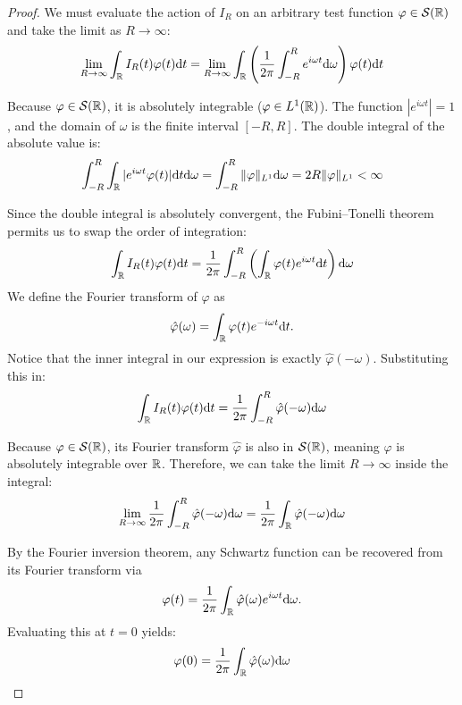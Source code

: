 \begin{proof}
We must evaluate the action of $I_R$ on an arbitrary test function $\varphi \in \mathcal{S}(\mathbb{R})$ and take the limit as $R \to \infty$:
\begin{equation}
\lim_{R \to \infty} \int_{\mathbb{R}} I_R(t) \varphi(t) \mathrm{d} t = \lim_{R \to \infty} \int_{\mathbb{R}} \left( \frac{1}{2\pi} \int_{-R}^R e^{i\omega t} \mathrm{d} \omega \right) \varphi(t) \mathrm{d} t
\end{equation}

Because $\varphi \in \mathcal{S}(\mathbb{R})$, it is absolutely integrable ($\varphi \in L^1(\mathbb{R})$). The function $|e^{i\omega t}| = 1$, and the domain of $\omega$ is the finite interval $[-R, R]$. The double integral of the absolute value is:
\begin{equation}
\int_{-R}^R \int_{\mathbb{R}} |e^{i\omega t} \varphi(t)| \mathrm{d} t \mathrm{d} \omega = \int_{-R}^R \|\varphi\|_{L^1} \mathrm{d} \omega = 2R \|\varphi\|_{L^1} < \infty
\end{equation}

Since the double integral is absolutely convergent, the Fubini--Tonelli theorem permits us to swap the order of integration:
\begin{equation}
\int_{\mathbb{R}} I_R(t) \varphi(t) \mathrm{d} t = \frac{1}{2\pi} \int_{-R}^R \left( \int_{\mathbb{R}} \varphi(t) e^{i\omega t} \mathrm{d} t \right) \mathrm{d} \omega
\end{equation}
We define the Fourier transform of $\varphi$ as
\[
\hat{\varphi}(\omega) = \int_{\mathbb{R}} \varphi(t) e^{-i\omega t} \mathrm{d} t.
\]
Notice that the inner integral in our expression is exactly $\hat{\varphi}(-\omega)$. Substituting this in:
\begin{equation}
\int_{\mathbb{R}} I_R(t) \varphi(t) \mathrm{d} t = \frac{1}{2\pi} \int_{-R}^R \hat{\varphi}(-\omega) \mathrm{d} \omega
\end{equation}

Because $\varphi \in \mathcal{S}(\mathbb{R})$, its Fourier transform $\hat{\varphi}$ is also in $\mathcal{S}(\mathbb{R})$, meaning $\hat{\varphi}$ is absolutely integrable over $\mathbb{R}$. Therefore, we can take the limit $R \to \infty$ inside the integral:
\begin{equation}
\lim_{R \to \infty} \frac{1}{2\pi} \int_{-R}^R \hat{\varphi}(-\omega) \mathrm{d} \omega = \frac{1}{2\pi} \int_{\mathbb{R}} \hat{\varphi}(-\omega) \mathrm{d} \omega
\end{equation}

By the Fourier inversion theorem, any Schwartz function can be recovered from its Fourier transform via
\[
\varphi(t) = \frac{1}{2\pi} \int_{\mathbb{R}} \hat{\varphi}(\omega) e^{i\omega t} \mathrm{d} \omega.
\]
Evaluating this at $t=0$ yields:
\begin{equation}
\varphi(0) = \frac{1}{2\pi} \int_{\mathbb{R}} \hat{\varphi}(\omega) \mathrm{d} \omega
\end{equation}


\end{proof}
